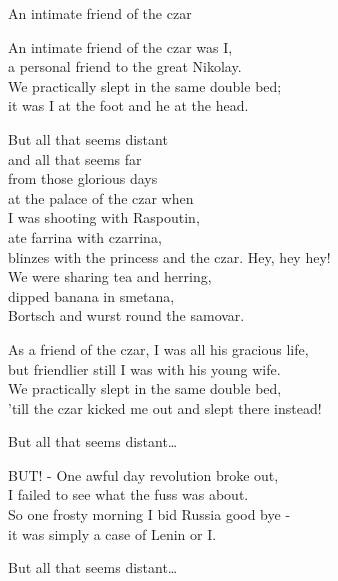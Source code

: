 \begin{song}{An intimate friend of the czar}
	

    \showversenumber	
	An intimate friend of the czar was I,\\
	a personal friend to the great Nikolay.\\
	We practically slept in the same double bed;\\
	it was I at the foot and he at the head.
	
	But all that seems distant\\
	and all that seems far\\
	from those glorious days\\
	at the palace of the czar when\\
	I was shooting with Raspoutin,\\
	ate farrina with czarrina,\\
	blinzes with the princess and the czar. Hey, hey hey!\\
	We were sharing tea and herring,\\
	dipped banana in smetana,\\
	Bortsch and wurst round the samovar.
	
    \showversenumber
	As a friend of the czar, I was all his gracious life,\\
	but friendlier still I was with his young wife.\\
	We practically slept in the same double bed,\\
	'till the czar kicked me out and slept there instead!
	
	But all that seems distant\ldots{}
	
    \showversenumber
	BUT! - One awful day revolution broke out,\\
	I failed to see what the fuss was about.\\
	So one frosty morning I bid Russia good bye -\\
	it was simply a case of Lenin or I.
	
	But all that seems distant\ldots{}
	
\end{song}
